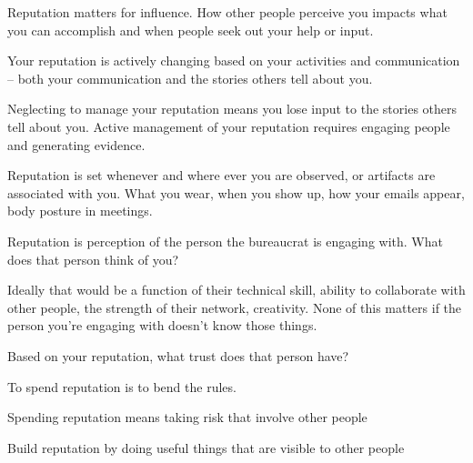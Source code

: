 
Reputation matters for influence. How other people perceive you impacts what you can accomplish and when people seek out your help or input.

Your reputation is actively changing based on your activities and communication -- both your communication and the stories others tell about you.

Neglecting to manage your reputation means you lose input to the stories others tell about you. Active management of your reputation requires engaging people and generating evidence. 

Reputation is set whenever and where ever you are observed, or artifacts are associated with you. What you wear, when you show up, how your emails appear, body posture in meetings. 


Reputation is perception of the person the bureaucrat is engaging with.  What does that person think of you?

Ideally that would be a function of their technical skill, ability to collaborate with other people, the strength of their network, creativity. None of this matters if the person you're engaging with doesn't know those things. 

Based on your reputation, what trust does that person have? 

To spend reputation is to bend the rules. 

Spending reputation means taking risk that involve other people

Build reputation by doing useful things that are visible to other people
